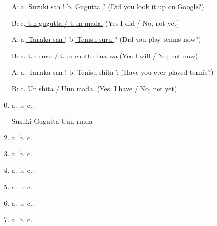 \documentclass[uplatex,dvipdfmx,b5paper,english,10pt]{jsbook}
\begin{document}
\begin{itemize}
 \item[A:] a.\underline{ Suzuki san }! b.\underline{ Gugutta }? (Did you look it up on Google?)
 \item[B:] c.\underline{ Un gugutta./ Uun mada.} (Yes I did / No, not yet)
 \item[A:] a.\underline{ Tanaka san }! b.\underline{ Tenisu suru }? (Did you play tennis now?)
 \item[B:] c.\underline{ Un suru / Uun chotto ima wa} (Yes I will / No, not now)
 \item[A:] a.\underline{ Tanaka san }! b.\underline{ Tenisu shita }? (Have you ever played tennis?)
 \item[B:] c.\underline{ Un shita / Uun mada.} (Yes, I have / No, not yet)
\end{itemize}

\begin{enumerate}
 \setcounter{enumi}{-1}
 \item a.\underline{\hspace{8zw}} b.\underline{\hspace{12zw}} c.\hrulefill.
 \vspace{-1.1\baselineskip}
 \item[] \hspace{3zw} Suzuki \hspace{5zw} Gugutta \hspace{7zw} Uun mada
 \item a.\underline{\hspace{8zw}} b.\underline{\hspace{12zw}} c.\hrulefill.
 \item a.\underline{\hspace{8zw}} b.\underline{\hspace{12zw}} c.\hrulefill.
 \item a.\underline{\hspace{8zw}} b.\underline{\hspace{12zw}} c.\hrulefill.
 \item a.\underline{\hspace{8zw}} b.\underline{\hspace{12zw}} c.\hrulefill.
 \item a.\underline{\hspace{8zw}} b.\underline{\hspace{12zw}} c.\hrulefill.
 \item a.\underline{\hspace{8zw}} b.\underline{\hspace{12zw}} c.\hrulefill.
\end{enumerate}
\end{document}
